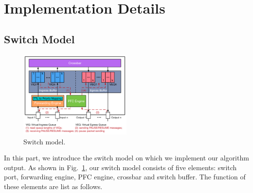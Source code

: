 \section{Implementation Details}\label{sec:implementation}

\subsection{Switch Model}\label{subsec:model}

\begin{figure}
	\centering
		\includegraphics[width=0.5\textwidth] {figs/switch_model}
	\caption{Switch model.}\label{fig:switchmodel}

\end{figure}

In this part, we introduce the switch model on which we implement our algorithm output. As shown in Fig.~\ref{fig:switchmodel},
our switch model consists of five elements: switch port, forwarding engine, PFC engine, crossbar and switch buffer. The function of these elements are list as follows.


